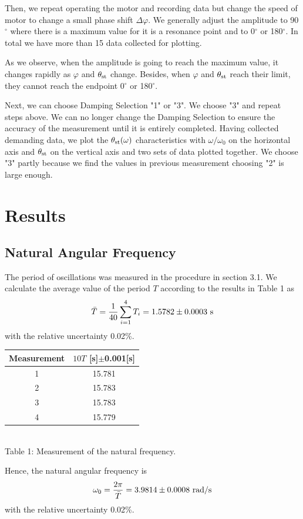 \documentclass[a4paper]{report}
\begin{document}
	Then, we repeat operating the motor and recording data but change the speed of motor to change a small phase shift $\Delta\varphi$. We generally adjust the amplitude to 90$^\circ$ where there is a maximum value for it is a resonance point and to 0$^\circ$ or 180$^\circ$. In total we have more than 15 data collected for plotting.
	
	As we observe, when the amplitude is going to reach the maximum value, it changes rapidly as $\varphi$ and $\theta_{\rm{st}}$ change. Besides, when $\varphi$ and $\theta_{\rm{st}}$ reach their limit, they cannot reach the endpoint 0$^\circ$ or 180$^\circ$.
	
	Next, we can choose \textsf{Damping Selection} "1" or "3". We choose "3" and repeat steps above. We can no longer change the \textsf{Damping Selection} to ensure the accuracy of the measurement until it is entirely completed. Having collected demanding data, we plot the $\theta_{\rm{st}}(\omega)$ characteristics with $\omega/\omega_0$ on the horizontal axis and $\theta_{\rm{st}}$ on the vertical axis and two sets of data plotted together. We choose "3" partly because we find the values in previous measurement choosing "2" is large enough.
	\section{Results}
	\subsection{Natural Angular Frequency}
	The period of oscillations was measured in the procedure in section 3.1. We calculate the average value of the period $T$ according to the results in Table 1 as
	\begin{equation*}
	\bar{T}=\frac{1}{40}\sum_{i=1}^4T_i=1.5782\pm0.0003 \ \rm s
	\end{equation*}
	with the relative uncertainty 0.02\%.
	\begin{center}
	\begin{tabular}{|c|c|}
		\hline
		Measurement&$10T$ [s]$\pm$0.001[s]\\
		\hline
		1&15.781\\
		\hline
		2&15.783\\
		\hline
		3&15.783\\
		\hline
		4&15.779\\
		\hline
	\end{tabular}
		\vspace{0.5cm}
		\\Table 1: Measurement of the natural frequency.
	\end{center}
	Hence, the natural angular frequency is
	\begin{equation*}
	\omega_0=\frac{2\pi}{\bar{T}}=3.9814\pm0.0008\ \rm{rad/s}
	\end{equation*}
	with the relative uncertainty 0.02\%.
\end{document}
